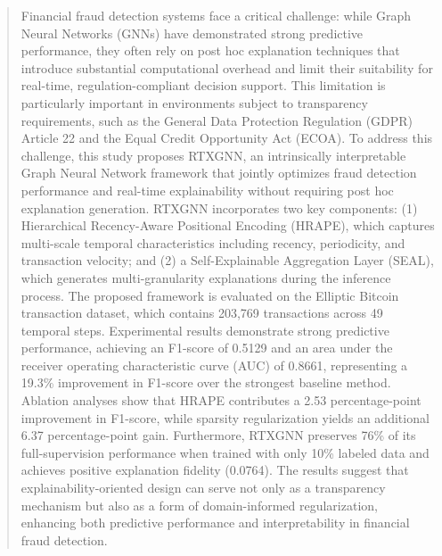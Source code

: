 \documentclass[preprint,12pt,authoryear]{elsarticle}
\begin{document}
\begin{frontmatter}
\begin{abstract}
Financial fraud detection systems face a critical challenge: while Graph Neural Networks (GNNs) have demonstrated strong predictive performance, they often rely on post hoc explanation techniques that introduce substantial computational overhead and limit their suitability for real-time, regulation-compliant decision support. This limitation is particularly important in environments subject to transparency requirements, such as the General Data Protection Regulation (GDPR) Article 22 and the Equal Credit Opportunity Act (ECOA). To address this challenge, this study proposes RTXGNN, an intrinsically interpretable Graph Neural Network framework that jointly optimizes fraud detection performance and real-time explainability without requiring post hoc explanation generation. RTXGNN incorporates two key components: (1) Hierarchical Recency-Aware Positional Encoding (HRAPE), which captures multi-scale temporal characteristics including recency, periodicity, and transaction velocity; and (2) a Self-Explainable Aggregation Layer (SEAL), which generates multi-granularity explanations during the inference process. The proposed framework is evaluated on the Elliptic Bitcoin transaction dataset, which contains 203,769 transactions across 49 temporal steps. Experimental results demonstrate strong predictive performance, achieving an F1-score of 0.5129 and an area under the receiver operating characteristic curve (AUC) of 0.8661, representing a 19.3\% improvement in F1-score over the strongest baseline method. Ablation analyses show that HRAPE contributes a 2.53 percentage-point improvement in F1-score, while sparsity regularization yields an additional 6.37 percentage-point gain. Furthermore, RTXGNN preserves 76\% of its full-supervision performance when trained with only 10\% labeled data and achieves positive explanation fidelity (0.0764). The results suggest that explainability-oriented design can serve not only as a transparency mechanism but also as a form of domain-informed regularization, enhancing both predictive performance and interpretability in financial fraud detection.
\end{abstract}




\end{frontmatter}
\end{document}
